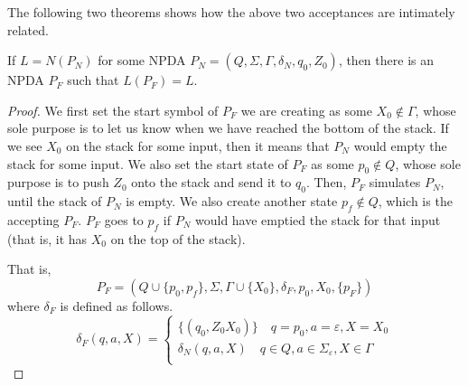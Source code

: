 The following two theorems shows how the above two acceptances are intimately related.

\begin{lemma}
If $L=N(P_N)$ for some NPDA $P_N=(Q,\Sigma,\Gamma,\delta_N,q_0,Z_0)$, then there is an NPDA $P_F$ such that $L(P_F)=L$.
\end{lemma}
\begin{proof}
We first set the start symbol of $P_F$ we are creating as some $X_0\not\in\Gamma$, whose sole purpose is to let us know when we have reached the bottom of the stack. If we see $X_0$ on the stack for some input, then it means that $P_N$ would empty the stack for some input. We also set the start state of $P_F$ as some $p_0\not\in Q$, whose sole purpose is to push $Z_0$ onto the stack and send it to $q_0$. Then, $P_F$ simulates $P_N$, until the stack of $P_N$ is empty. We also create another state $p_f\not\in Q$, which is the accepting $P_F$. $P_F$ goes to $p_f$ if $P_N$ would have emptied the stack for that input (that is, it has $X_0$ on the top of the stack).

That is, $$P_F=(Q\cup\{p_0,p_f\}, \Sigma, \Gamma\cup\{X_0\}, \delta_F, p_0, X_0, \{p_F\})$$where $\delta_F$ is defined as follows.
$$
\delta_F(q,a,X)=
\begin{cases}
\{(q_0,Z_0X_0)\}\quad q=p_0, a=\varepsilon, X=X_0 \\
\delta_N(q,a,X)\quad q\in Q, a\in\Sigma_\varepsilon, X\in\Gamma \\

\end{cases}
$$
\end{proof}